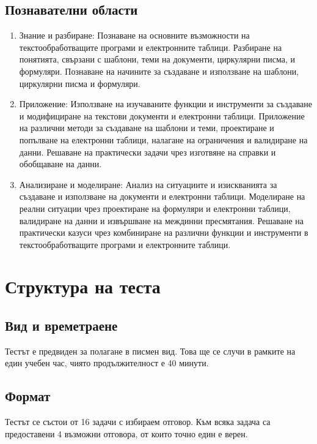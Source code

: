 \subsection{Познавателни области}
\begin{enumerate}
    \item Знание и разбиране:
          \subitem Познаване на основните възможности на текстообработващите програми и електронните таблици.
          \subitem Разбиране на понятията, свързани с шаблони, теми на документи, циркулярни писма, и формуляри.
          \subitem Познаване на начините за създаване и използване на шаблони, циркулярни писма и формуляри.

    \item Приложение:
          \subitem Използване на изучаваните функции и инструменти за създаване и модифициране на текстови документи и електронни таблици.
          \subitem Приложение на различни методи за създаване на шаблони и теми, проектиране и попълване на електронни таблици, налагане на ограничения и валидиране на данни.
          \subitem Решаване на практически задачи чрез изготвяне на справки и обобщаване на данни.

    \item Анализиране и моделиране:
          \subitem Анализ на ситуациите и изискванията за създаване и използване на документи и електронни таблици.
          \subitem Моделиране на реални ситуации чрез проектиране на формуляри и електронни таблици, валидиране на данни и извършване на междинни пресмятания.
          \subitem Решаване на практически казуси чрез комбиниране на различни функции и инструменти в текстообработващите програми и електронните таблици.
\end{enumerate}

\section{Структура на теста}

\subsection{Вид и времетраене}

Тестът е предвиден за полагане в писмен вид. Това ще се случи в рамките на един учебен час, чиято продължителност е 40 минути.

\subsection{Формат}
Тестът се състои от 16 задачи с избираем отговор. Към всяка задача са предоставени 4 възможни отговора, от които точно един е верен.

